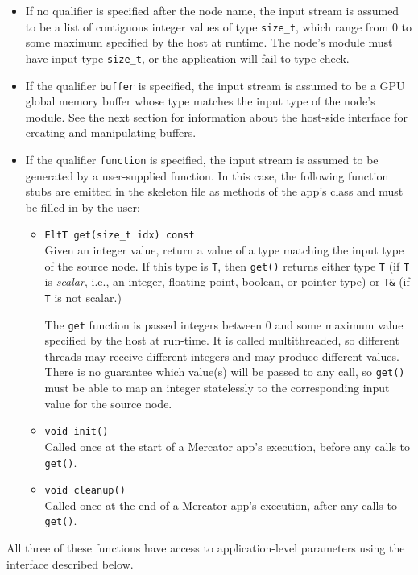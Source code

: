 \documentclass[11pt]{article}
\begin{document}
\begin{itemize}

\item If no qualifier is specified after the node name, the input
  stream is assumed to be a list of contiguous integer values of type
  \texttt{size_t}, which range from 0 to some maximum specified by the
  host at runtime.  The node's module must have input type
  \texttt{size_t}, or the application will fail to type-check.

\item If the qualifier \texttt{buffer} is specified, the input stream
  is assumed to be a GPU global memory buffer whose type matches the
  input type of the node's module.  See the next section for
  information about the host-side interface for creating and
  manipulating buffers.
  
\item If the qualifier \texttt{function} is specified, the input
  stream is assumed to be generated by a user-supplied function.  In
  this case, the following function stubs are emitted in the skeleton
  file as methods of the app's class and must be filled in by the
  user:
  
  \begin{itemize}
    \item \texttt{EltT get(size_t idx) const} \\ 
      Given an integer value, return a value of a type matching the input
      type of the source node. If this type is \texttt{T}, then
      \texttt{get()} returns either type \texttt{T} (if \texttt{T} is
      \emph{scalar}, i.e., an integer, floating-point, boolean, or pointer
      type) or \texttt{T\&} (if \texttt{T} is not scalar.)
      
      The \texttt{get} function is passed integers between 0 and some
      maximum value specified by the host at run-time.  It is called
      multithreaded, so different threads may receive different
      integers and may produce different values.  There is no
      guarantee which value(s) will be passed to any call, so
      \texttt{get()} must be able to map an integer statelessly to the
      corresponding input value for the source node.
      
    \item \texttt{void init()} \\
      Called once at the start of a Mercator app's execution, before
      any calls to \texttt{get()}.

    \item \texttt{void cleanup()} \\
      Called once at the end of a Mercator app's execution, after
      any calls to \texttt{get()}.
      
  \end{itemize}
\end{itemize}
All three of these functions have access to application-level
parameters using the interface described below.
\end{document}
